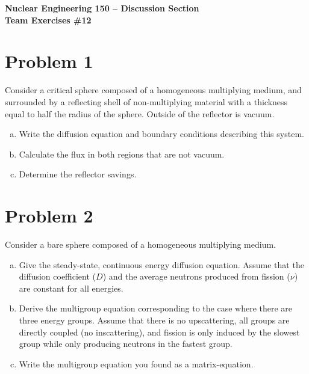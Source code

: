 \documentclass{report}
\begin{document}
\begin{center}
\textbf{\large Nuclear Engineering 150 -- Discussion Section}\\ 
\textbf{Team Exercises \#12}
\end{center}

\section*{Problem 1}

Consider a critical sphere composed of a homogeneous multiplying medium, and surrounded by a reflecting shell of non-multiplying material with a thickness equal to half the radius of the sphere. Outside of the reflector is vacuum.
\begin{enumerate}[a.)]
\item Write the diffusion equation and boundary conditions describing this system.
\item Calculate the flux in both regions that are not vacuum.
\item Determine the reflector savings.
\end{enumerate}




\newpage
\section*{Problem 2}

Consider a bare sphere composed of a homogeneous multiplying medium.
\begin{enumerate}[a.)]
\item Give the steady-state, continuous energy diffusion equation. Assume that the diffusion coefficient ($D$) and the average neutrons produced from fission ($\nu$) are constant for all energies.
\item Derive the multigroup equation corresponding to the case where there are three energy groups. Assume that there is no upscattering, all groups are directly coupled (no inscattering), and fission is only induced by the slowest group while only producing neutrons in the fastest group.
\item Write the multigroup equation you found as a matrix-equation.
\end{enumerate}
\end{document}
